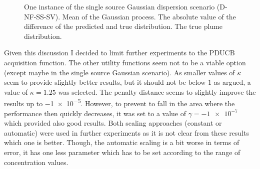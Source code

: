 \begin{figure}
    \centering
    \caption[Example visualization of the plume prediction]{One instance of the 
        single source Gaussian dispersion scenario (D-NF-SS-SV).  
         Mean of the Gaussian process.  
         The absolute value of the difference of the 
        predicted and true distribution.   The true plume 
        distribution.}\label{fig:plume}
\end{figure}

Given this discussion I decided to limit further experiments to the PDUCB 
acquisition function. The other utility functions seem not to be a viable option 
(except maybe in the single source Gaussian scenario). As smaller values of 
$\kappa$ seem to provide slightly better results, but it should not be below $1$ 
as argued, a value of $\kappa = 1.25$ was selected. The penalty distance seems 
to slightly improve the results up to \num{-1e-5}. However, to prevent to fall 
in the area where the performance then quickly decreases, it was set to a value 
of $\gamma = \num{-1e-7}$ which provided also good results. Both scaling 
approaches (constant or automatic) were used in further experiments as it is not 
clear from these results which one is better. Though, the automatic scaling is 
a bit worse in terms of error, it has one less parameter which has to be set 
according to the range of concentration values.

